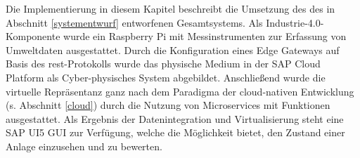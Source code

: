 Die Implementierung in diesem Kapitel beschreibt die Umsetzung des des in Abschnitt \ref{systementwurf} entworfenen Gesamtsystems. Als Industrie-4.0-Komponente wurde ein Raspberry Pi mit Messinstrumenten zur Erfassung von Umweltdaten ausgestattet. Durch die Konfiguration eines Edge Gateways auf Basis des \ac{rest}-Protokolls wurde das physische Medium in der SAP Cloud Platform als Cyber-physisches System abgebildet. Anschließend wurde die virtuelle Repräsentanz ganz nach dem Paradigma der cloud-nativen Entwicklung (s. Abschnitt \ref{cloud}) durch die Nutzung von Microservices mit Funktionen ausgestattet. Als Ergebnis der Datenintegration und Virtualisierung steht eine SAP UI5 GUI zur Verfügung, welche die Möglichkeit bietet, den Zustand einer Anlage einzusehen und zu bewerten.

